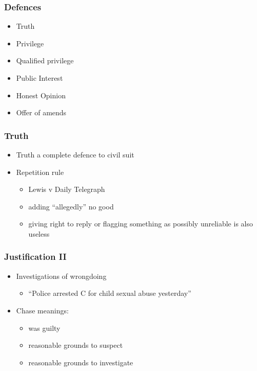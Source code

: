 \documentclass[ignorenonframetext,]{beamer}
\begin{document}
\begin{frame}
\frametitle{Defences}

\begin{itemize}
\item  Truth
\item  Privilege
\item  Qualified privilege
\item  Public Interest
\item  Honest Opinion
\item  Offer of amends
\end{itemize}
\end{frame}

\begin{frame}
\frametitle{Truth}

\begin{itemize}
\item  Truth a complete defence to civil suit
\item  Repetition rule

  \begin{itemize}
  \item    Lewis v Daily Telegraph
  \item    adding ``allegedly'' no good
  \item    giving right to reply or flagging something as possibly
    unreliable is also useless
  \end{itemize}
\end{itemize}
\end{frame}

\begin{frame}
\frametitle{Justification II}

\begin{itemize}
\item  Investigations of wrongdoing

  \begin{itemize}
  \item    ``Police arrested C for child sexual abuse yesterday''
  \end{itemize}
\item  {Chase} meanings:

  \begin{itemize}
  \item    was guilty
  \item    reasonable grounds to suspect
  \item    reasonable grounds to investigate
  \end{itemize}
\end{itemize}
\end{frame}
\end{document}
